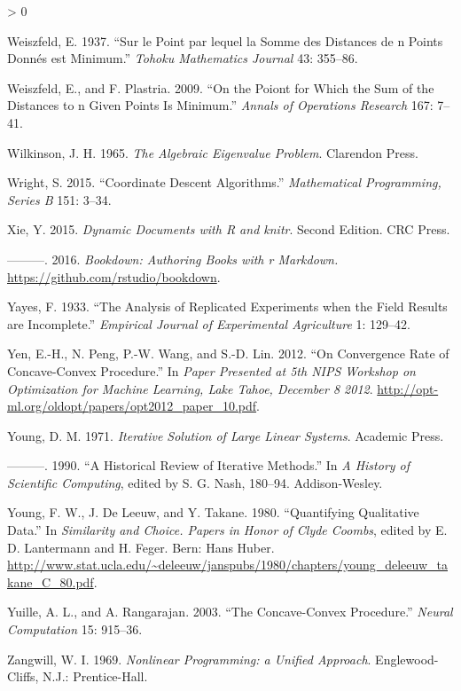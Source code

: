 \documentclass[
  12pt,
]{book}
\newlength{\cslhangindent}
\newenvironment{CSLReferences}[2] %
 {%
  \setlength{\parindent}{0pt}
  \ifodd #1 \everypar{\setlength{\hangindent}{\cslhangindent}}\ignorespaces\fi
  \ifnum #2 > 0
  \setlength{\parskip}{#2\baselineskip}
  \fi
 }%
 {}
\begin{document}
\begin{CSLReferences}{1}{0}
\leavevmode\hypertarget{ref-weiszfeld_37}{}%
Weiszfeld, E. 1937. {``{Sur le Point par lequel la Somme des Distances de n Points Donnés est Minimum}.''} \emph{Tohoku Mathematics Journal} 43: 355--86.

\leavevmode\hypertarget{ref-weiszfeld_plastria_09}{}%
Weiszfeld, E., and F. Plastria. 2009. {``On the Poiont for Which the Sum of the Distances to n Given Points Is Minimum.''} \emph{Annals of Operations Research} 167: 7--41.

\leavevmode\hypertarget{ref-wilkinson_65}{}%
Wilkinson, J. H. 1965. \emph{{The Algebraic Eigenvalue Problem}}. Clarendon Press.

\leavevmode\hypertarget{ref-wright_15}{}%
Wright, S. 2015. {``{Coordinate Descent Algorithms}.''} \emph{Mathematical Programming, Series B} 151: 3--34.

\leavevmode\hypertarget{ref-xie_15}{}%
Xie, Y. 2015. \emph{{Dynamic Documents with R and knitr}}. Second Edition. CRC Press.

\leavevmode\hypertarget{ref-xie_16}{}%
---------. 2016. \emph{Bookdown: Authoring Books with r Markdown.} \url{https://github.com/rstudio/bookdown}.

\leavevmode\hypertarget{ref-yates_33}{}%
Yayes, F. 1933. {``{The Analysis of Replicated Experiments when the Field Results are Incomplete}.''} \emph{Empirical Journal of Experimental Agriculture} 1: 129--42.

\leavevmode\hypertarget{ref-yen_peng_wang_lin_12}{}%
Yen, E.-H., N. Peng, P.-W. Wang, and S.-D. Lin. 2012. {``{On Convergence Rate of Concave-Convex Procedure}.''} In \emph{Paper Presented at 5th NIPS Workshop on Optimization for Machine Learning, Lake Tahoe, December 8 2012}. \url{http://opt-ml.org/oldopt/papers/opt2012_paper_10.pdf}.

\leavevmode\hypertarget{ref-young_71}{}%
Young, D. M. 1971. \emph{Iterative Solution of Large Linear Systems}. Academic Press.

\leavevmode\hypertarget{ref-young_90}{}%
---------. 1990. {``A Historical Review of Iterative Methods.''} In \emph{A History of Scientific Computing}, edited by S. G. Nash, 180--94. Addison-Wesley.

\leavevmode\hypertarget{ref-young_deleeuw_takane_C_80}{}%
Young, F. W., J. De Leeuw, and Y. Takane. 1980. {``Quantifying Qualitative Data.''} In \emph{Similarity and Choice. Papers in Honor of Clyde Coombs}, edited by E. D. Lantermann and H. Feger. Bern: Hans Huber. \url{http://www.stat.ucla.edu/~deleeuw/janspubs/1980/chapters/young_deleeuw_takane_C_80.pdf}.

\leavevmode\hypertarget{ref-yuille_rangarajan_03}{}%
Yuille, A. L., and A. Rangarajan. 2003. {``{The Concave-Convex Procedure}.''} \emph{Neural Computation} 15: 915--36.

\leavevmode\hypertarget{ref-zangwill_69}{}%
Zangwill, W. I. 1969. \emph{{Nonlinear Programming: a Unified Approach}}. Englewood-Cliffs, N.J.: Prentice-Hall.

\end{CSLReferences}
\end{document}

